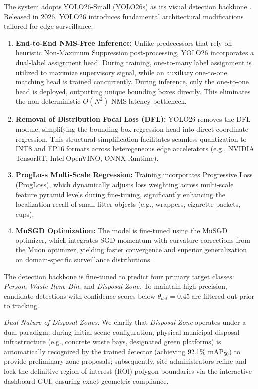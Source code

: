 \documentclass[conference]{IEEEtran}
\begin{document}
The system adopts YOLO26-Small (YOLO26s) as its visual detection backbone \cite{b3}. Released in 2026, YOLO26 introduces fundamental architectural modifications tailored for edge surveillance:

\begin{enumerate}
\item \textbf{End-to-End NMS-Free Inference:} Unlike predecessors that rely on heuristic Non-Maximum Suppression post-processing, YOLO26 incorporates a dual-label assignment head. During training, one-to-many label assignment is utilized to maximize supervisory signal, while an auxiliary one-to-one matching head is trained concurrently. During inference, only the one-to-one head is deployed, outputting unique bounding boxes directly. This eliminates the non-deterministic $O(N^2)$ NMS latency bottleneck.
\item \textbf{Removal of Distribution Focal Loss (DFL):} YOLO26 removes the DFL module, simplifying the bounding box regression head into direct coordinate regression. This structural simplification facilitates seamless quantization to INT8 and FP16 formats across heterogeneous edge accelerators (e.g., NVIDIA TensorRT, Intel OpenVINO, ONNX Runtime).
\item \textbf{ProgLoss Multi-Scale Regression:} Training incorporates Progressive Loss (ProgLoss), which dynamically adjusts loss weighting across multi-scale feature pyramid levels during fine-tuning, significantly enhancing the localization recall of small litter objects (e.g., wrappers, cigarette packets, cups).
\item \textbf{MuSGD Optimization:} The model is fine-tuned using the MuSGD optimizer, which integrates SGD momentum with curvature corrections from the Muon optimizer, yielding faster convergence and superior generalization on domain-specific surveillance distributions.
\end{enumerate}

The detection backbone is fine-tuned to predict four primary target classes: \textit{Person}, \textit{Waste Item}, \textit{Bin}, and \textit{Disposal Zone}. To maintain high precision, candidate detections with confidence scores below $\theta_{det} = 0.45$ are filtered out prior to tracking.

\textit{Dual Nature of Disposal Zones:} We clarify that \textit{Disposal Zone} operates under a dual paradigm: during initial scene configuration, physical municipal disposal infrastructure (e.g., concrete waste bays, designated green platforms) is automatically recognized by the trained detector (achieving 92.1\% $\text{mAP}_{50}$) to provide preliminary zone proposals; subsequently, site administrators refine and lock the definitive region-of-interest (ROI) polygon boundaries via the interactive dashboard GUI, ensuring exact geometric compliance.
\end{document}
